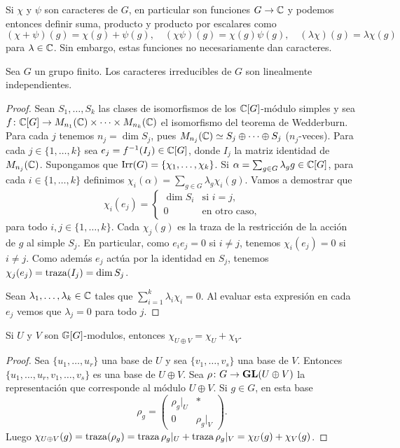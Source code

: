 Si $\chi$ y $\psi$ son caracteres de $G$, en particular son funciones $G\to\mathbb{C}$ y podemos entonces
definir suma, producto y producto por escalares como
\[
(\chi+\psi)(g)=\chi(g)+\psi(g),\quad
(\chi\psi)(g)=\chi(g)\psi(g),\quad
(\lambda\chi)(g)=\lambda\chi(g)
\]
para $\lambda\in\mathbb{C}$. Sin embargo, estas funciones no necesariamente dan caracteres. 

\begin{theorem}
Sea $G$ un grupo finito. Los caracteres irreducibles de $G$ son linealmente independientes.
\end{theorem}

\begin{proof}
Sean $S_1,\dots,S_k$ las clases de isomorfismos de los $\mathbb{C}[G]$-módulo simples y
sea $f\colon \mathbb{C}[G]\to M_{n_1}(\mathbb{C})\times\cdots\times M_{n_k}(\mathbb{C})$ el isomorfismo del teorema de Wedderburn. 
Para cada $j$ tenemos $n_j=\dim S_j$, pues $M_{n_j}(\mathbb{C})\simeq S_j\oplus\cdots\oplus S_j$ ($n_j$-veces). 
Para cada $j\in\{1,\dots,k\}$ sea 
$e_j=f^{-1}(I_j)\in\mathbb{C}[G]$, donde $I_j$ la matriz identidad de $M_{n_j}(\mathbb{C})$. 
Supongamos que $\operatorname{Irr}(G)=\{\chi_1,\dots,\chi_k\}$. 
Si $\alpha=\sum_{g\in G}\lambda_gg\in\mathbb{C}[G]$, 
para cada $i\in\{1,\dots,k\}$ 
definimos $\chi_i(\alpha)=\sum_{g\in G}\lambda_g\chi_i(g)$. 
Vamos a demostrar que
\[
\chi_i(e_j)=\begin{cases}
\dim S_i & \text{si $i=j$},\\
0 & \text{en otro caso,}
\end{cases}
\]
para todo $i,j\in\{1,\dots,k\}$.
Cada $\chi_j(g)$ es la traza de la restricción de la acción de $g$ al simple $S_j$. En particular, 
como $e_ie_j=0$ si $i\ne j$, tenemos 
$\chi_i(e_j)=0$ si $i\ne j$. 
Como además $e_j$ actúa por la identidad en $S_j$, tenemos $\chi_j(e_j)=\operatorname{traza}(I_j)=\dim S_j$. 

Sean $\lambda_1,\dots,\lambda_k\in\mathbb{C}$ tales que $\sum_{i=1}^k\lambda_i\chi_i=0$. Al evaluar esta
expresión en cada $e_j$ vemos que $\lambda_j=0$ para todo $j$. 
\end{proof}

\begin{proposition}
    Si $U$ y $V$ son $\mathbb{G}[G]$-modulos, entonces $\chi_{U\oplus V}=\chi_U+\chi_V$.
\end{proposition}

\begin{proof}
    Sea $\{u_1,\dots,u_r\}$ una base de $U$ y sea $\{v_1,\dots,v_s\}$ una base de $V$. Entonces 
    $\{u_1,\dots,u_r,v_1,\dots,v_s\}$ es una base de $U\oplus V$. 
    Sea $\rho\colon G\to \mathbf{GL}(U\oplus V)$ la representación que corresponde al módulo $U\oplus V$. 
    Si $g\in G$, en esta
    base 
    \[
    \rho_g=\begin{pmatrix}
      \rho_g|_U & *\\
      0 & \rho_g|_V
    \end{pmatrix}.
    \]
    Luego $\chi_{U\oplus V}(g)=\operatorname{traza}(\rho_g)=\operatorname{traza}\rho_g|_U+\operatorname{traza}\rho_g|_V=\chi_U(g)+\chi_V(g)$.
\end{proof}

